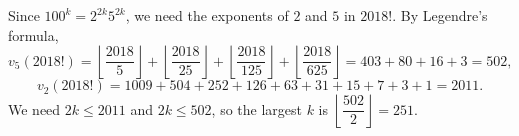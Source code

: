 Since $100^k=2^{2k}5^{2k}$, we need the exponents of $2$ and $5$ in $2018!$. By Legendre's formula,
\[
v_5(2018!)=\left\lfloor\dfrac{2018}{5}\right\rfloor+\left\lfloor\dfrac{2018}{25}\right\rfloor+\left\lfloor\dfrac{2018}{125}\right\rfloor+\left\lfloor\dfrac{2018}{625}\right\rfloor=403+80+16+3=502,
\]
\[
v_2(2018!)=1009+504+252+126+63+31+15+7+3+1=2011 .
\]
We need $2k\le2011$ and $2k\le502$, so the largest $k$ is $\left\lfloor\dfrac{502}{2}\right\rfloor=\boxed{251}$.
